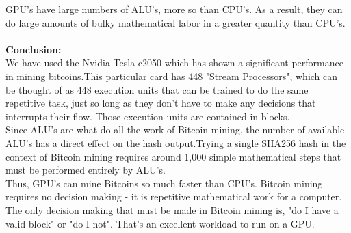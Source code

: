 \documentclass[a4paper,11pt]{article}
\begin{document}
GPU's have large numbers of ALU's, more so than CPU's. As a result, they can do large amounts of bulky mathematical labor in a greater quantity than CPU's.\\\\
\textbf{Conclusion:}\\
We have used the Nvidia Tesla c2050 which has shown a significant performance in mining bitcoins.This particular card has 448 "Stream Processors", which can be thought of as 448 execution units that can be trained to  do the same repetitive task, just so long as they don't have to make any decisions that interrupts their flow. Those execution units are contained in blocks.\\
Since ALU's are what do all the work of Bitcoin mining, the number of available ALU's has a direct effect on the hash output.Trying a single SHA256 hash in the context of Bitcoin mining requires around 1,000 simple mathematical steps that must be performed entirely by ALU's.\\
Thus, GPU's can mine Bitcoins so much faster than CPU's. Bitcoin mining requires no decision making - it is repetitive mathematical work for a computer. The only decision making that must be made in Bitcoin mining is, "do I have a valid block" or "do I not". That's an excellent workload to run on a GPU.
\end{document}
